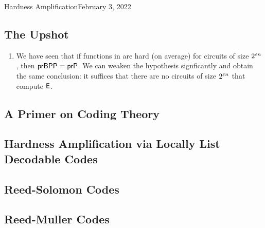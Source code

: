 \begin{lecture}{3}{Hardness Amplification}{February 3, 2022}

\subsection*{The Upshot}

\begin{enumerate}
  \item We have seen that if functions in \E are hard (on average) for circuits
    of size $2^{\varepsilon n}$, then $\textsf{prBPP} = \textsf{prP}$. We can weaken the hypothesis
    signficantly and obtain the same conclusion: it suffices that there are
    no circuits of size $2^{\varepsilon n}$ that compute $\textsf{E}$.
\end{enumerate}
  

\subsection{A Primer on Coding Theory}

\subsection{Hardness Amplification via Locally List Decodable Codes}

\subsection{Reed-Solomon Codes}

\subsection{Reed-Muller Codes}

\end{lecture}
